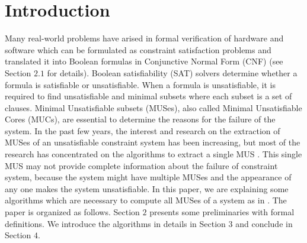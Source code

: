 \section{Introduction}
\label{sec:introduction}
Many real-world problems have arised in formal verification of hardware and software which can be formulated as constraint satisfaction problems and translated it into Boolean formulas in Conjunctive Normal Form (CNF) (see Section $2.1$ for details). Boolean satisfiability (SAT) solvers determine whether a formula is satisfiable or unsatisfiable. When a formula is unsatisfiable, it is required to find unsatisfiable and minimal subsets where each subset is a set of clauses. Minimal Unsatisfiable subsets (MUSes), also called Minimal Unsatisfiable Cores (MUCs), are essential to determine the reasons for the failure of the system. In the past few years, the interest and research on the extraction of MUSes of an unsatisfiable constraint system has been increasing, but most of the research has concentrated on the algorithms to extract a single MUS \cite{karem}. This single MUS may not provide complete information about the failure of constraint system, because the system might have multiple MUSes and the appearance of any one makes the system unsatisfiable.\newline
In this paper, we are explaining some algorithms which are necessary to compute all MUSes of a system as in \cite{karem}. The paper is organized as follows. Section $2$ presents some preliminaries with formal definitions. We introduce the algorithms in details in Section $3$ and conclude in Section $4$.